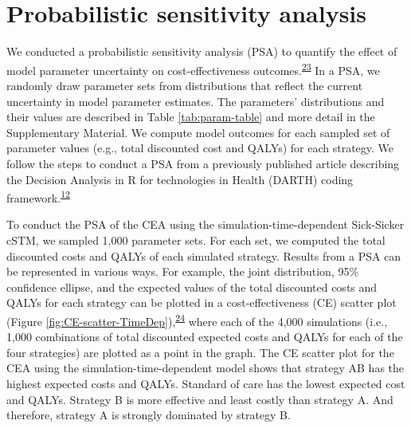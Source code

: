 \documentclass[
]{article}
\begin{document}
\hypertarget{probabilistic-sensitivity-analysis}{%
\section{Probabilistic sensitivity analysis}\label{probabilistic-sensitivity-analysis}}

We conducted a probabilistic sensitivity analysis (PSA) to quantify the effect of model parameter uncertainty on cost-effectiveness outcomes.\textsuperscript{\protect\hyperlink{ref-Briggs2012}{23}} In a PSA, we randomly draw parameter sets from distributions that reflect the current uncertainty in model parameter estimates. The parameters' distributions and their values are described in Table \ref{tab:param-table} and more detail in the Supplementary Material. We compute model outcomes for each sampled set of parameter values (e.g., total discounted cost and QALYs) for each strategy. We follow the steps to conduct a PSA from a previously published article describing the Decision Analysis in R for technologies in Health (DARTH) coding framework.\textsuperscript{\protect\hyperlink{ref-Alarid-Escudero2019e}{12}}

To conduct the PSA of the CEA using the simulation-time-dependent Sick-Sicker cSTM, we sampled 1,000 parameter sets. For each set, we computed the total discounted costs and QALYs of each simulated strategy. Results from a PSA can be represented in various ways. For example, the joint distribution, 95\% confidence ellipse, and the expected values of the total discounted costs and QALYs for each strategy can be plotted in a cost-effectiveness (CE) scatter plot (Figure \ref{fig:CE-scatter-TimeDep}),\textsuperscript{\protect\hyperlink{ref-Briggs2002}{24}} where each of the 4,000 simulations (i.e., 1,000 combinations of total discounted expected costs and QALYs for each of the four strategies) are plotted as a point in the graph. The CE scatter plot for the CEA using the simulation-time-dependent model shows that strategy AB has the highest expected costs and QALYs. Standard of care has the lowest expected cost and QALYs. Strategy B is more effective and least costly than strategy A. And therefore, strategy A is strongly dominated by strategy B.
\end{document}

